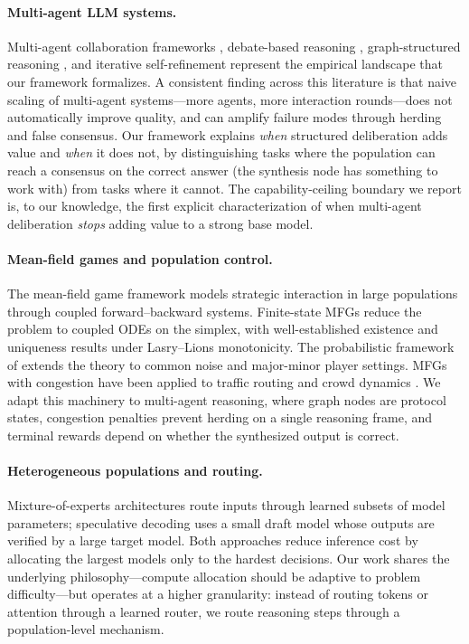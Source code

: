 \documentclass[11pt]{amsart}
\newcommand\1{{\mathds{1}}}
\theoremstyle{definition}
\theoremstyle{remark}
\numberwithin{equation}{section}
\begin{document}
\paragraph{Multi-agent LLM systems.}
Multi-agent collaboration frameworks \cite{Wu2023AutoGen, Hong2024MetaGPT, Li2023CAMEL, Qian2024ChatDev}, debate-based reasoning \cite{Irving2018Debate, Du2023Debate, Khan2024Debate}, graph-structured reasoning \cite{Yao2023ToT, Besta2024GoT}, and iterative self-refinement \cite{Shinn2023Reflexion, Madaan2023SelfRefine} represent the empirical landscape that our framework formalizes.
A consistent finding across this literature is that naive scaling of multi-agent systems---more agents, more interaction rounds---does not automatically improve quality, and can amplify failure modes through herding and false consensus.
Our framework explains \emph{when} structured deliberation adds value and \emph{when} it does not, by distinguishing tasks where the population can reach a consensus on the correct answer (the synthesis node has something to work with) from tasks where it cannot.
The capability-ceiling boundary we report is, to our knowledge, the first explicit characterization of when multi-agent deliberation \emph{stops} adding value to a strong base model.

\paragraph{Mean-field games and population control.}
The mean-field game framework \cite{LasryLions2007, HuangMalhameCaines2006} models strategic interaction in large populations through coupled forward--backward systems.
Finite-state MFGs \cite{Gomes2010, Gueant2015, Cecchin2019} reduce the problem to coupled ODEs on the simplex, with well-established existence and uniqueness results under Lasry--Lions monotonicity.
The probabilistic framework of \cite{CarmonaDelarue2018} extends the theory to common noise and major-minor player settings.
MFGs with congestion have been applied to traffic routing \cite{Achdou2020MFGTraffic} and crowd dynamics \cite{Lachapelle2011MFGCrowd}.
We adapt this machinery to multi-agent reasoning, where graph nodes are protocol states, congestion penalties prevent herding on a single reasoning frame, and terminal rewards depend on whether the synthesized output is correct.

\paragraph{Heterogeneous populations and routing.}
Mixture-of-experts architectures \cite{Shazeer2017MoE} route inputs through learned subsets of model parameters; speculative decoding \cite{Leviathan2023Speculative} uses a small draft model whose outputs are verified by a large target model.
Both approaches reduce inference cost by allocating the largest models only to the hardest decisions.
Our work shares the underlying philosophy---compute allocation should be adaptive to problem difficulty---but operates at a higher granularity: instead of routing tokens or attention through a learned router, we route reasoning steps through a population-level mechanism.
\end{document}
